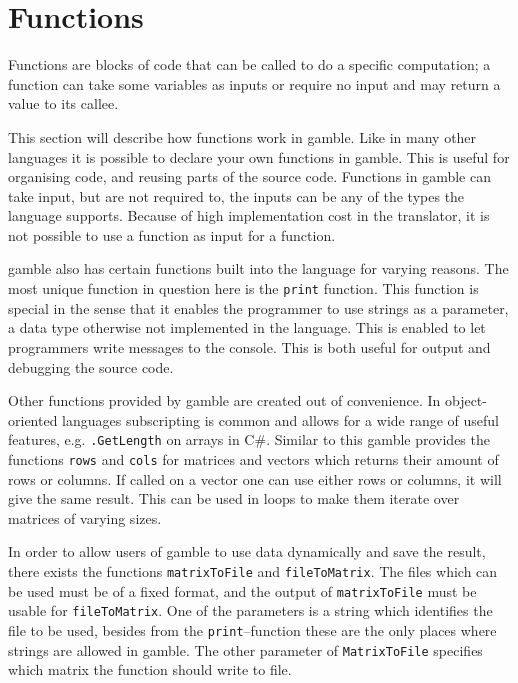 \section{Functions}\label{sec:funcs}
Functions are blocks of code that can be called to do a specific computation; a function can take some variables as inputs or require no input and may return a value to its callee.

This section will describe how functions work in \gls{gamble}.
Like in many other languages it is possible to declare your own functions in \gls{gamble}.
This is useful for organising code, and reusing parts of the source code.
Functions in \gls{gamble} can take input, but are not required to, the inputs can be any of the types the language supports.
Because of high implementation cost in the translator, it is not possible to use a function as input for a function.

\gls{gamble} also has certain functions built into the language for varying reasons.
The most unique function in question here is the \texttt{print} function.
This function is special in the sense that it enables the programmer to use strings as a parameter, a data type otherwise not implemented in the language.
This is enabled to let programmers write messages to the console.
This is both useful for output and debugging the source code.

Other functions provided by \gls{gamble} are created out of convenience.
In object-oriented languages subscripting is common and allows for a wide range of useful features, e.g. \texttt{.GetLength} on arrays in C\#.
Similar to this \gls{gamble} provides the functions \texttt{rows} and \texttt{cols} for matrices and vectors which returns their amount of rows or columns.
If called on a vector one can use either rows or columns, it will give the same result.
This can be used in loops to make them iterate over matrices of varying sizes.

In order to allow users of \gls{gamble} to use data dynamically and save the result, there exists the functions \texttt{matrixToFile} and \texttt{fileToMatrix}. 
The files which can be used must be of a fixed format, and the output of \texttt{matrixToFile} must be usable for \texttt{fileToMatrix}.
One of the parameters is a string which identifies the file to be used, besides from the \texttt{print}--function these are the only places where strings are allowed in \gls{gamble}.
The other parameter of \texttt{MatrixToFile} specifies which matrix the function should write to file.

